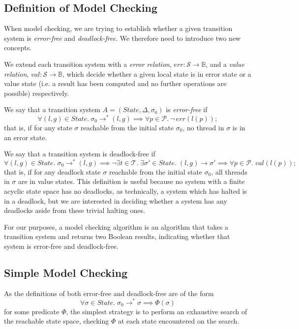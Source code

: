 \documentclass[12pt,a4paper,twoside,openright]{report}
\begin{document}
\subsection{Definition of Model Checking}
When model checking, we are trying to establish whether a
given transition system is \emph{error-free} and
\emph{deadlock-free}. We therefore need to introduce two
new concepts.

We extend each transition system with a \emph{error relation},
$\textit{err} : \mathcal{S} \to \mathbb{B}$, and a \emph{value relation},
$\textit{val} : \mathcal{S} \to \mathbb{B}$, which decide whether a given
local state is in error state or a value state (i.e. a result has
been computed and no further operations are possible) respectively.

We say that a transition system $A = (\textit{State}, \Delta, \sigma_0)$ is
\emph{error-free} if
\[
	\forall (l, g) \in \textit{State}. \ \sigma_0 \longrightarrow^* (l, g)
	\implies \forall p \in \mathcal{P}.\ \neg\,\textit{err}(l(p));
\]
that is, if for any state $\sigma$ reachable from the initial state
$\sigma_0$, no thread in $\sigma$ is in an error state.

We say that a transition system is deadlock-free if
\[
	\forall (l, g) \in \textit{State}. \;\sigma_0 \longrightarrow^* (l, g)
	\implies \neg \exists t \in \mathcal{T}.\;
		\exists\sigma' \in \textit{State}.\;(l, g) \longrightarrow \sigma'
	\implies \forall p \in \mathcal{P}.\;\textit{val}(l(p));
\]
that is, if for any deadlock state $\sigma$ reachable from
the initial state $\sigma_0$, all threads in $\sigma$ are
in value states. This definition is useful because no
system with a finite acyclic state space has no deadlocks,
as technically, a system which has halted is in a deadlock,
but we are interested in deciding whether a system has any
deadlocks aside from these trivial halting ones.

For our purposes, a model checking algorithm is an
algorithm that takes a transition system and returns
two Boolean results, indicating whether that system
is error-free and deadlock-free.

\subsection{Simple Model Checking} \label{sec:simple-model-checking}
As the definitions of both error-free and deadlock-free
are of the form
\[
	\forall \sigma \in \textit{State}.\; \sigma_0 \longrightarrow^* \sigma
	\implies \Phi (\sigma)
\]
for some predicate $\Phi$, the simplest strategy is to
perform an exhaustive search of the reachable state space,
checking $\Phi$ at each state encountered on the search.
\end{document}
